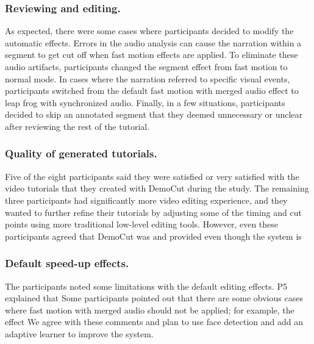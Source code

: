 \subsubsection{Reviewing and editing.} As expected, there were some cases where
participants decided to modify the automatic effects. Errors in the audio analysis can cause the narration within a
segment to get cut off when fast motion effects are applied.  To eliminate these
audio artifacts, participants changed the segment effect from fast
motion to normal mode. In cases where the narration referred to
specific visual events, participants switched from the default fast
motion with merged audio effect to leap frog with synchronized
audio. Finally, in a few situations, participants decided to skip an
annotated segment that they deemed unnecessary or unclear after
reviewing the rest of the tutorial.

\subsubsection{Quality of generated tutorials.} Five of the eight
participants said they were satisfied or very satisfied with the video
tutorials that they created with DemoCut during the study.
The remaining three participants had significantly more video
editing experience, and they wanted to further refine their tutorials
by adjusting some of the timing and cut points using more traditional
low-level editing tools.
%
However, even these participants agreed that DemoCut was
 and provided  even though the system is 

\subsubsection{Default speed-up effects.} The participants noted some limitations
with the default editing effects. P5 explained that  Some
participants pointed out that there are some obvious cases where fast
motion with merged audio should not be applied; for example, the
effect  We agree with
these comments and plan to use face detection and add an adaptive learner to
improve the system. %


